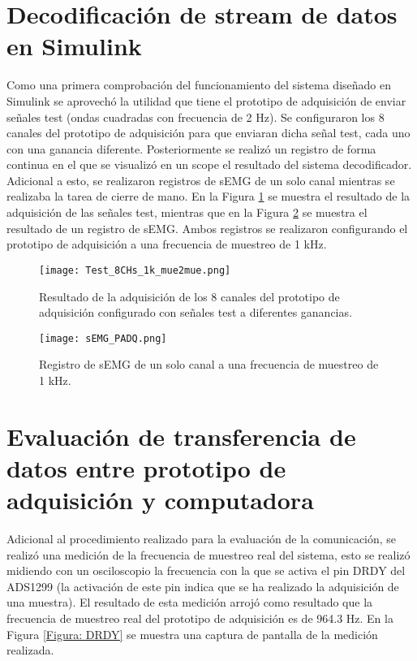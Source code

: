 \section{Decodificación de stream de datos en Simulink}

Como una primera comprobación del funcionamiento del sistema diseñado en Simulink se aprovechó la utilidad que tiene el prototipo de adquisición de enviar señales test (ondas cuadradas con frecuencia de 2 Hz). Se configuraron los 8 canales del prototipo de adquisición para que enviaran dicha señal test, cada uno con una ganancia diferente. Posteriormente se realizó un registro de forma continua en el que se visualizó en un scope el resultado del sistema decodificador. Adicional a esto, se realizaron registros de sEMG de un solo canal mientras se realizaba la tarea de cierre de mano. En la Figura \ref{Figura: Test_PADQ} se muestra el resultado de la adquisición de las señales test, mientras que en la Figura \ref{Figura: sEMG_PADQ} se muestra el resultado de un registro de sEMG. Ambos registros se realizaron configurando el prototipo de adquisición a una frecuencia de muestreo de 1 kHz.

\begin{figure}[htbp]
	\centering
	\texttt{[image: Test\_8CHs\_1k\_mue2mue.png]}
	\caption{Resultado de la adquisición de los 8 canales del prototipo de adquisición configurado con señales test a diferentes ganancias.}
	\label{Figura: Test_PADQ}
\end{figure}

\begin{figure}[htbp]
	\centering
	\texttt{[image: sEMG\_PADQ.png]}
	\caption{Registro de sEMG de un solo canal a una frecuencia de muestreo de 1 kHz.}
	\label{Figura: sEMG_PADQ}
\end{figure}

\section{Evaluación de transferencia de datos entre prototipo de adquisición y computadora}

Adicional al procedimiento realizado para la evaluación de la comunicación, se realizó una medición de la frecuencia de muestreo real del sistema, esto se realizó midiendo con un osciloscopio la frecuencia con la que se activa el pin DRDY del ADS1299 (la activación de este pin indica que se ha realizado la adquisición de una muestra). El resultado de esta medición arrojó como resultado que la frecuencia de muestreo real del prototipo de adquisición es de 964.3 Hz. En la Figura \ref{Figura: DRDY} se muestra una captura de pantalla de la medición realizada.

